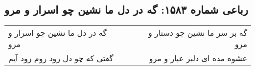 \begin{center}
\section*{رباعی شماره ۱۵۸۳: گه در دل ما نشین چو اسرار و مرو}
\label{sec:1583}
\begin{longtable}{l p{0.5cm} r}
گه در دل ما نشین چو اسرار و مرو
&&
گه بر سر ما نشین چو دستار و مرو
\\
گفتی که چو دل زود روم زود آیم
&&
عشوه مده ای دلبر عیار و مرو
\\
\end{longtable}
\end{center}
